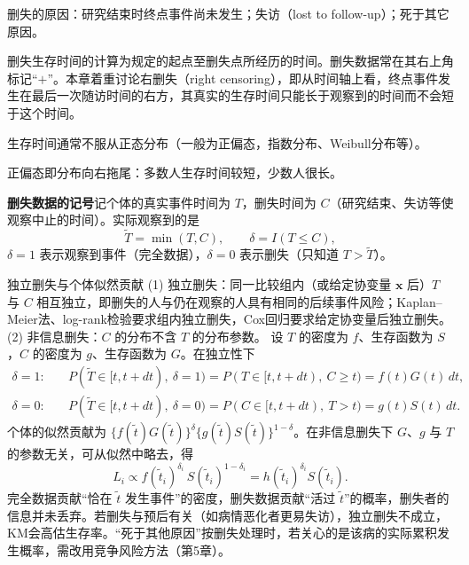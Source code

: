 删失的原因：研究结束时终点事件尚未发生；失访（lost to follow-up）；死于其它原因。

删失生存时间的计算为规定的起点至删失点所经历的时间。删失数据常在其右上角标记“$+$”。本章着重讨论右删失（right censoring），即从时间轴上看，终点事件发生在最后一次随访时间的右方，其真实的生存时间只能长于观察到的时间而不会短于这个时间。

生存时间通常不服从正态分布（一般为正偏态，指数分布、Weibull分布等）。
\begin{annotation}正偏态即分布向右拖尾：多数人生存时间较短，少数人很长。\end{annotation}
\textbf{删失数据的记号}\quad 记个体的真实事件时间为 $T$，删失时间为 $C$（研究结束、失访等使观察中止的时间）。实际观察到的是
\[
\widetilde T=\min(T,C),\qquad \delta=I(T\le C),
\]
$\delta=1$ 表示观察到事件（完全数据），$\delta=0$ 表示删失（只知道 $T>\widetilde T$）。
\begin{derivation}{独立删失与个体似然贡献}
(1) 独立删失：同一比较组内（或给定协变量 $\bm x$ 后）$T$ 与 $C$ 相互独立，即删失的人与仍在观察的人具有相同的后续事件风险；Kaplan--Meier法、log-rank检验要求组内独立删失，Cox回归要求给定协变量后独立删失。(2) 非信息删失：$C$ 的分布不含 $T$ 的分布参数。
设 $T$ 的密度为 $f$、生存函数为 $S$，$C$ 的密度为 $g$、生存函数为 $G$。在独立性下
\[
\begin{aligned}
\delta=1:&\quad P(\widetilde T\in[t,t+dt),\ \delta=1)=P(T\in[t,t+dt),\ C\ge t)=f(t)G(t)\,dt,\\
\delta=0:&\quad P(\widetilde T\in[t,t+dt),\ \delta=0)=P(C\in[t,t+dt),\ T>t)=g(t)S(t)\,dt .
\end{aligned}
\]
个体的似然贡献为 $\{f(\tilde t)G(\tilde t)\}^\delta\{g(\tilde t)S(\tilde t)\}^{1-\delta}$。在非信息删失下 $G$、$g$ 与 $T$ 的参数无关，可从似然中略去，得
\[
L_i\propto f(\tilde t_i)^{\delta_i}\,S(\tilde t_i)^{1-\delta_i}=h(\tilde t_i)^{\delta_i}S(\tilde t_i).
\]
完全数据贡献“恰在 $\tilde t$ 发生事件”的密度，删失数据贡献“活过 $\tilde t$”的概率，删失者的信息并未丢弃。若删失与预后有关（如病情恶化者更易失访），独立删失不成立，KM会高估生存率。“死于其他原因”按删失处理时，若关心的是该病的实际累积发生概率，需改用竞争风险方法（第5章）。
\end{derivation}
